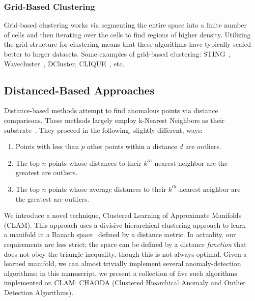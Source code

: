 \subsubsection{Grid-Based Clustering}

Grid-based clustering works via segmenting the entire space into a finite number of cells and then iterating over the cells to find regions of higher density.
Utilizing the grid structure for clustering means that these algorithms have typically scaled better to larger datasets.
Some examples of grid-based clustering: 
STING~\cite{sting:wang}, 
Wavecluster~\cite{Wavecluster:Sheikholeslami:2000}, 
DCluster,  %
CLIQUE~\cite{rakesh_agrawal_automatic_1998}, 
etc.

\subsection{Distanced-Based Approaches}

Distance-based methods attempt to find anomalous points via distance comparisons.
These methods largely employ k-Nearest Neighbors as their substrate~\cite{wang_progress_2019}.
They proceed in the following, slightly different, ways:

\begin{enumerate}
    \item Points with less than $p$ other points within a distance $d$ are outliers.
    \item The top $n$ points whose distances to their $k^{th}$-nearest neighbor are the greatest are outliers.
    \item The top $n$ points whose average distances to their $k^{th}$-nearest neighbor are the greatest are outliers.
\end{enumerate}


We introduce a novel technique, Clustered Learning of Approximate Manifolds (CLAM). This
approach uses a divisive hierarchical clustering approach to learn a manifold in a
Banach space~\cite{} defined by a distance metric. In actuality, our requirements are
less strict; the space can be defined by a distance \textit{function} that does not obey
the triangle inequality, though this is not always optimal. Given a learned manifold, we
can almost trivially implement several anomaly-detection algorithms; in this manuscript,
we present a collection of five such algorithms implemented on CLAM: CHAODA (Clustered Hiearchical Anomaly and Outlier Detection Algorithms).


